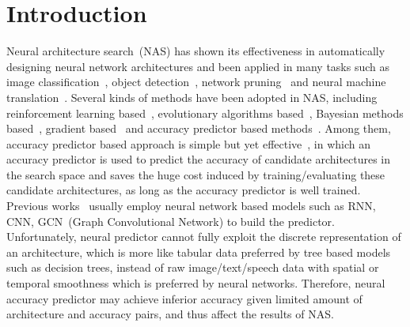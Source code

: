 \documentclass{article}
\begin{document}
\section{Introduction}
\label{sec:intro}
Neural architecture search~(NAS) has shown its effectiveness in automatically designing neural network architectures and been applied in many tasks such as image classification~\cite{nas,nasnet}, object detection~\cite{nasfpn,detnas}, network pruning~\cite{autoslim} and neural machine translation~\cite{evovledtransformer}. Several kinds of methods have been adopted in NAS, including reinforcement learning based~\cite{nasnet,enas}, evolutionary algorithms based~\cite{amoebanet,darts}, Bayesian methods based~\cite{bayesnas}, gradient based~\cite{nao,darts} and accuracy predictor based methods~\cite{nao,neuralpredictor}. Among them, accuracy predictor based approach is simple but yet effective~\cite{nao,neuralpredictor}, in which an accuracy predictor is used to predict the accuracy of candidate architectures in the search space and saves the huge cost induced by training/evaluating these candidate architectures, as long as the accuracy predictor is well trained. Previous works~\cite{perfpred,PNAS,nao,neuralpredictor} usually employ neural network based models such as RNN, CNN, GCN~(Graph Convolutional Network) to build the predictor. Unfortunately, neural predictor cannot fully exploit the discrete representation of an architecture, which is more like tabular data preferred by tree based models such as decision trees, instead of raw image/text/speech data with spatial or temporal smoothness which is preferred by neural networks. Therefore, neural accuracy predictor may achieve inferior accuracy given limited amount of architecture and accuracy pairs, and thus affect the results of NAS.
\end{document}
